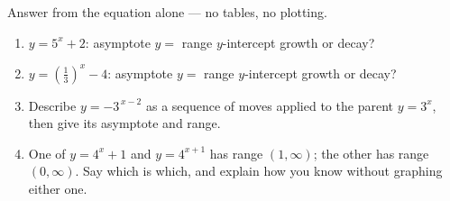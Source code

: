 \documentclass[10pt]{article}
\begin{document}
\begin{practicebox}
Answer from the equation alone --- no tables, no plotting.
\begin{enumerate}[leftmargin=1.7em, itemsep=7pt]
  \item $y=5^{x}+2$: \quad asymptote $y=$ \blank{1.2cm} \quad range \blank{2.2cm} \quad
        $y$-intercept \blank{1.8cm} \quad growth or decay? \blank{1.8cm}

  \item $y=\left(\frac{1}{3}\right)^{x}-4$: \quad asymptote $y=$ \blank{1.2cm} \quad range
        \blank{2.2cm} \quad $y$-intercept \blank{1.8cm} \quad growth or decay? \blank{1.8cm}

  \item Describe $y=-3^{\,x-2}$ as a sequence of moves applied to the parent $y=3^{x}$, then give its
        asymptote and range. \writeline

  \item One of $y=4^{x}+1$ and $y=4^{x+1}$ has range $(1,\infty)$; the other has range $(0,\infty)$.
        Say which is which, and explain how you know without graphing either one. 
\end{enumerate}
\end{practicebox}
\end{document}
